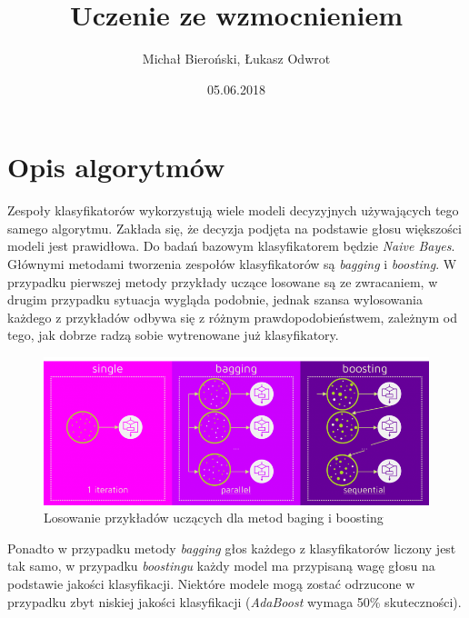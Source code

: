 \documentclass[12pt,a4paper]{article}
\title{Uczenie ze wzmocnieniem}
\date{05.06.2018}
\author{Michał Bieroński, Łukasz Odwrot}
\begin{document}
\maketitle
\thispagestyle{empty}
\newpage
\tableofcontents
\setcounter{page}{1}
\newpage

\section{Opis algorytmów}
Zespoły klasyfikatorów wykorzystują wiele modeli decyzyjnych używających tego samego algorytmu. Zakłada się, że decyzja podjęta na podstawie głosu większości modeli jest prawidłowa. Do badań bazowym klasyfikatorem będzie \textit{Naive Bayes}. Głównymi metodami tworzenia zespołów klasyfikatorów są \textit{bagging} i \textit{boosting}. W przypadku pierwszej metody przykłady uczące losowane są ze zwracaniem, w drugim przypadku sytuacja wygląda podobnie, jednak szansa wylosowania każdego z przykładów odbywa się z różnym prawdopodobieństwem, zależnym od tego, jak dobrze radzą sobie wytrenowane już klasyfikatory.

\begin{figure}[H]
\centering
\includegraphics{choseWorks.png}
\caption{Losowanie przykładów uczących dla metod baging i boosting}
\end{figure}

Ponadto w przypadku metody \textit{bagging} głos każdego z klasyfikatorów liczony jest tak samo, w przypadku \textit{boostingu} każdy model ma przypisaną wagę głosu na podstawie jakości klasyfikacji. Niektóre modele mogą zostać odrzucone w przypadku zbyt niskiej jakości klasyfikacji (\textit{AdaBoost} wymaga 50\% skuteczności). 
\end{document}
